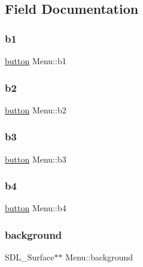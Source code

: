 \subsection{Field Documentation}
\mbox{\label{structMenu_a4e551cc9d8e601477c9b433586e94e85}} 
\subsubsection{\texorpdfstring{b1}{b1}}
{\footnotesize\ttfamily \mbox{\hyperlink{structbutton}{button}} Menu\+::b1}

\mbox{\label{structMenu_a6fb16be02b74f37999a5bcbe533acf06}} 
\subsubsection{\texorpdfstring{b2}{b2}}
{\footnotesize\ttfamily \mbox{\hyperlink{structbutton}{button}} Menu\+::b2}

\mbox{\label{structMenu_a28dd906295886472d4a1ea8e8891dd87}} 
\subsubsection{\texorpdfstring{b3}{b3}}
{\footnotesize\ttfamily \mbox{\hyperlink{structbutton}{button}} Menu\+::b3}

\mbox{\label{structMenu_afa19f7b80780740b37f639305dac3ca2}} 
\subsubsection{\texorpdfstring{b4}{b4}}
{\footnotesize\ttfamily \mbox{\hyperlink{structbutton}{button}} Menu\+::b4}

\mbox{\label{structMenu_a7ec6851118a11d54ac1963d488bbb5cb}} 
\subsubsection{\texorpdfstring{background}{background}}
{\footnotesize\ttfamily S\+D\+L\+\_\+\+Surface$\ast$$\ast$ Menu\+::background}

